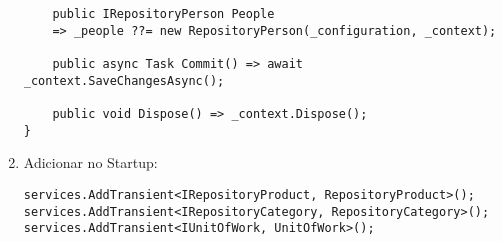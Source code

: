 \documentclass{article}
\begin{document}
\begin{enumerate}
\begin{verbatim}
    public IRepositoryPerson People
    => _people ??= new RepositoryPerson(_configuration, _context);
        
    public async Task Commit() => await _context.SaveChangesAsync();

    public void Dispose() => _context.Dispose();
}

    \end{verbatim}
    
    \item Adicionar no Startup:
    \begin{verbatim}
services.AddTransient<IRepositoryProduct, RepositoryProduct>();
services.AddTransient<IRepositoryCategory, RepositoryCategory>();
services.AddTransient<IUnitOfWork, UnitOfWork>();
    \end{verbatim}
\end{enumerate}
\end{document}
